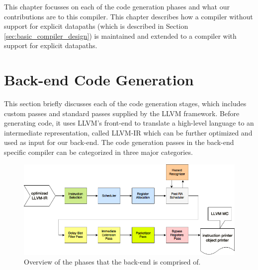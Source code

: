 

This chapter focusses on each of the code generation phases and what our contributions are to this compiler. This chapter describes how a compiler without support for explicit datapaths (which is described in Section \ref{sec:basic_compiler_design}) is maintained and extended to a compiler with support for explicit datapaths. 



\section{Back-end Code Generation}\label{sec:code_generation}
This section briefly discusses each of the code generation stages, which includes custom passes and standard passes supplied by the LLVM framework. Before generating code, it uses LLVM's front-end to translate a high-level language to an intermediate representation, called LLVM-IR which can be further optimized and used as input for our back-end. The code generation passes in the back-end specific compiler can be categorized in three major categories.

\begin{figure}[H]
\centering
\hspace*{-.12in}
\includegraphics[scale=0.53]{figures/code_generation}
\caption{Overview of the phases that the back-end is comprised of.}
\label{fig:simd_backend}
\end{figure}

